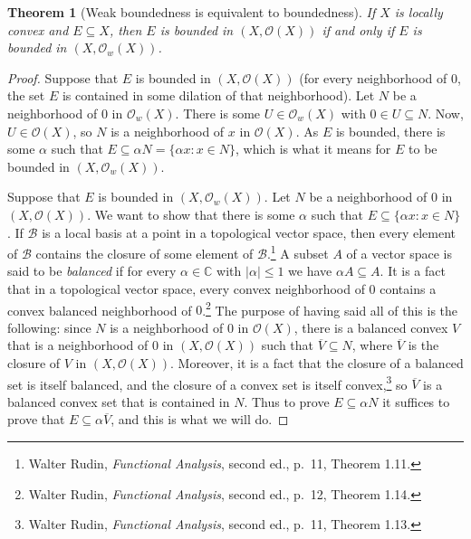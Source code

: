 \documentclass{article}
\newtheorem{theorem}{Theorem}
\begin{document}
\begin{theorem}[Weak boundedness is equivalent to boundedness]
If $X$ is locally convex and $E \subseteq X$, then $E$ is bounded in
$(X,\mathcal{O}(X))$ if and only if $E$ is bounded in $(X,\mathcal{O}_w(X))$.
\label{weakbounded}
\end{theorem}
\begin{proof}
Suppose that $E$ is bounded in $(X,\mathcal{O}(X))$ (for every neighborhood of $0$, the set $E$ is contained in some dilation of that neighborhood). Let $N$ be a neighborhood of $0$ in $\mathcal{O}_w(X)$. 
There is some $U \in \mathcal{O}_w(X)$ with $0 \in U \subseteq N$. Now, $U \in \mathcal{O}(X)$, so $N$ is a neighborhood
of $x$ in $\mathcal{O}(X)$. As $E$ is bounded, there is some $\alpha$ such that $E \subseteq \alpha N =  \{\alpha x:x \in N\}$,
which is what it means for  $E$ to be bounded in $(X,\mathcal{O}_w(X))$. 

Suppose that $E$ is bounded in $(X,\mathcal{O}_w(X))$. Let $N$ be a neighborhood of $0$ in 
$(X,\mathcal{O}(X))$. We want to show that there is some $\alpha$ such that $E \subseteq \{\alpha x: x \in N\}$. 
If $\mathcal{B}$ is a local basis at a point in a topological vector space, then every element of $\mathcal{B}$ contains
the closure of some element of $\mathcal{B}$.\footnote{Walter Rudin, {\em Functional Analysis}, second ed., p.~11, Theorem 1.11.}
A subset $A$ of a vector space is said to be {\em balanced} if for every $\alpha \in \mathbb{C}$ with $|\alpha|\leq 1$ we have
$\alpha A \subseteq A$. It is a fact that in a topological vector space, every convex neighborhood of $0$ contains a convex balanced neighborhood of $0$.\footnote{Walter
Rudin, {\em Functional Analysis}, second ed., p.~12, Theorem 1.14.} The purpose of having said all of this is the following: since $N$ is a neighborhood
of $0$ in  $\mathcal{O}(X)$, there is a balanced convex $V$ that is a neighborhood of $0$ in $(X,\mathcal{O}(X))$ such that
$\overline{V} \subseteq N$, where $\overline{V}$ is the closure of $V$ in $(X,\mathcal{O}(X))$.
Moreover, it is a fact that the closure of a balanced set is itself balanced, and the closure of a convex set is itself convex,\footnote{Walter
Rudin, {\em Functional Analysis}, second ed., p.~11, Theorem 1.13.} so $\overline{V}$ is a balanced convex set that is contained in $N$. Thus to prove $E \subseteq \alpha N$
it suffices to prove that $E \subseteq \alpha \overline{V}$, and this is what we will do.


\end{proof}
\end{document}
